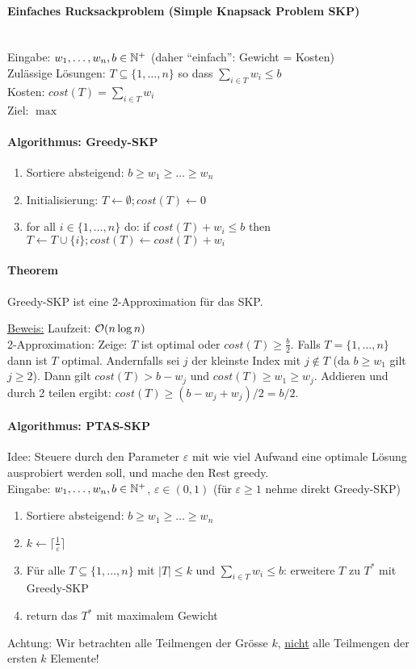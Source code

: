 \paragraph{Einfaches Rucksackproblem (Simple Knapsack Problem SKP)} \mbox{} \\
Eingabe: $w_1, \dots, w_n, b \in \mathbb{N}^+$ (daher ``einfach'': Gewicht = Kosten) \\
Zulässige Lösungen: $T \subseteq \{1, \dots, n\}$ so dass $\sum_{i \in T} w_i \leq b$ \\
Kosten: $cost(T) = \sum_{i \in T} w_i$ \\
Ziel: $\max$

\paragraph{Algorithmus: Greedy-SKP}
\begin{enumerate}
    \item Sortiere absteigend: $b \geq w_1 \geq \dots \geq w_n$
    \item Initialisierung: $T \leftarrow \emptyset; cost(T) \leftarrow 0$
    \item for all $i \in \{1, \dots, n\}$ do:
    if $cost(T)+w_i \leq b$ then $T \leftarrow T \cup \{i\}; cost(T) \leftarrow cost(T)+w_i$
\end{enumerate}

\paragraph{Theorem}
Greedy-SKP ist eine 2-Approximation für das SKP.

\underline{Beweis:}
Laufzeit: $\mathcal{O}(n \log n)$ \\
2-Approximation:
Zeige: $T$ ist optimal oder $cost(T) \geq \frac{b}{2}$.
Falls $T=\{1, \dots, n\}$ dann ist $T$ optimal.
Andernfalls sei $j$ der kleinste Index mit $j \notin T$ (da $b \geq w_1$ gilt $j \geq 2$).
Dann gilt $cost(T) > b -w_j$ und $cost(T) \geq w_1 \geq w_j$.
Addieren und durch 2 teilen ergibt: $cost(T) \geq (b-w_j+w_j)/2 = b/2$.

\paragraph{Algorithmus: PTAS-SKP}
Idee: Steuere durch den Parameter $\varepsilon$ mit wie viel Aufwand eine optimale Lösung ausprobiert werden
soll, und mache den Rest greedy. \\
Eingabe: $w_1, \dots, w_n, b \in \mathbb{N}^+$, $\varepsilon \in (0,1)$ (für $\varepsilon \geq 1$ nehme direkt Greedy-SKP)
\begin{enumerate}
    \item Sortiere absteigend: $b \geq w_1 \geq \dots \geq w_n$
    \item $k \leftarrow \lceil \frac{1}{\varepsilon} \rceil$
    \item Für alle $T \subseteq \{1, \dots, n\}$ mit $|T| \leq k$ und $\sum_{i \in T} w_i \leq b$:
    erweitere $T$ zu $T^*$ mit Greedy-SKP
    \item return das $T^*$ mit maximalem Gewicht
\end{enumerate}
Achtung: Wir betrachten alle Teilmengen der Grösse $k$, \underline{nicht} alle Teilmengen der ersten $k$ Elemente!

